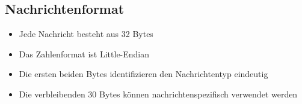\documentclass[10pt,a4paper]{article}
\begin{document}
		\subsection{Nachrichtenformat}
			\begin{itemize}
				\item Jede Nachricht besteht aus 32 Bytes
				\item Das Zahlenformat ist Little-Endian
				\item Die ersten beiden Bytes identifizieren den Nachrichtentyp eindeutig
				\item Die verbleibenden 30 Bytes können nachrichtenspezifisch verwendet werden
			\end{itemize}			
	\newpage	
	\printglossary[style=altlist,title=Glossar]
						
\end{document}
